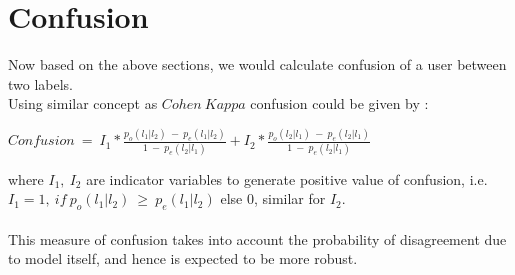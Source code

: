 \documentclass[twoside]{article}
\begin{document}
\section{Confusion}
Now based on the above sections, we would calculate confusion of a user between two labels.\\
Using similar concept as \href{https://en.wikipedia.org/wiki/Cohen's\_kappa}{$Cohen\ Kappa$} confusion could be given by :
\begin{center}
  $Confusion\ =\ I_1*\frac{p_o(l_1|l_2)\ -\ p_e(l_1|l_2)}{1\ -\ p_e(l_2|l_1)} + I_2*\frac{p_o(l_2|l_1)\ -\ p_e(l_2|l_1)}{1\ -\ p_e(l_2|l_1)}$
\end{center}
where $I_1,\ I_2$ are indicator variables to generate positive value of confusion, i.e. $I_1 = 1,\ if\ p_o(l_1|l_2)\ \geq\ p_e(l_1|l_2)$ else $0$, similar for $I_2$.\\\\
This measure of confusion takes into account the probability of disagreement due to model itself, and hence is expected to be more robust.
\end{document}
